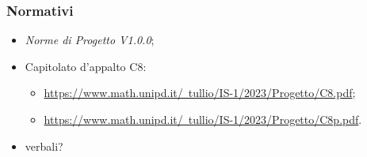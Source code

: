     \subsubsection{Normativi}
        \begin{itemize}
            \item \textit{Norme di Progetto V1.0.0};
            \item Capitolato d'appalto C8: 
                \begin{itemize}
                    \item   \href{https://www.math.unipd.it/~tullio/IS-1/2023/Progetto/C8.pdf}{https://www.math.unipd.it/~tullio/IS-1/2023/Progetto/C8.pdf};
                    \item   \href{https://www.math.unipd.it/~tullio/IS-1/2023/Progetto/C8p.pdf}{https://www.math.unipd.it/~tullio/IS-1/2023/Progetto/C8p.pdf}.
                \end{itemize}
            \item verbali?
        \end{itemize}


